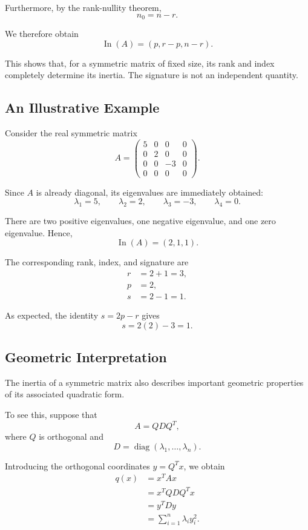 \documentclass[11pt]{article}
\theoremstyle{definition}
\theoremstyle{remark}
\begin{document}
Furthermore, by the rank-nullity theorem,
\[
    n_0=n-r.
\]

We therefore obtain
\[
    \boxed{
    \operatorname{In}(A)
    =(p,r-p,n-r)
    }.
\]

This shows that, for a symmetric matrix of fixed
size, its rank and index completely determine its
inertia. The signature is not an independent
quantity.

\subsection{An Illustrative Example}

Consider the real symmetric matrix
\[
    A=
    \begin{pmatrix}
        5&0&0&0\\
        0&2&0&0\\
        0&0&-3&0\\
        0&0&0&0
    \end{pmatrix}.
\]

Since $A$ is already diagonal, its eigenvalues
are immediately obtained:
\[
    \lambda_1=5,\qquad
    \lambda_2=2,\qquad
    \lambda_3=-3,\qquad
    \lambda_4=0.
\]

There are two positive eigenvalues, one negative
eigenvalue, and one zero eigenvalue. Hence,
\[
    \boxed{\operatorname{In}(A)=(2,1,1)}.
\]

The corresponding rank, index, and signature are
\[
\begin{aligned}
    r&=2+1=3,\\
    p&=2,\\
    s&=2-1=1.
\end{aligned}
\]

As expected, the identity $s=2p-r$ gives
\[
    s=2(2)-3=1.
\]

\subsection{Geometric Interpretation}

The inertia of a symmetric matrix also describes
important geometric properties of its associated
quadratic form.

To see this, suppose that
\[
    A=QDQ^T,
\]
where $Q$ is orthogonal and
\[
    D=\operatorname{diag}
    (\lambda_1,\ldots,\lambda_n).
\]

Introducing the orthogonal coordinates
$y=Q^Tx$, we obtain
\[
\begin{aligned}
    q(x)
    &=x^TAx\\
    &=x^TQDQ^Tx\\
    &=y^TDy\\
    &=\sum_{i=1}^{n}\lambda_i y_i^2.
\end{aligned}
\]
\end{document}
